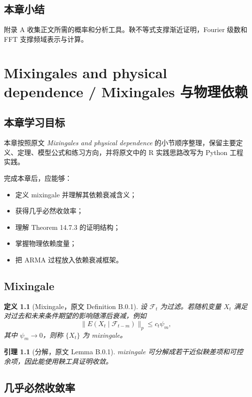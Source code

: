 \documentclass[11pt,a4paper,openany]{ctexbook}
\newtheorem{definition}{定义}[section]
\newtheorem{lemma}{引理}[section]
\begin{document}
\section*{本章小结}

附录 A 收集正文所需的概率和分析工具。鞅不等式支撑渐近证明，Fourier 级数和 FFT 支撑频域表示与计算。

\clearpage
\chapter{Mixingales and physical dependence / Mixingales 与物理依赖}
\section*{本章学习目标}

本章按照原文 \textit{Mixingales and physical dependence} 的小节顺序整理，保留主要定义、定理、模型公式和练习方向，并将原文中的 R 实践思路改写为 Python 工程实践。

完成本章后，应能够：
\begin{itemize}
  \item 定义 mixingale 并理解其依赖衰减含义；
  \item 获得几乎必然收敛率；
  \item 理解 Theorem 14.7.3 的证明结构；
  \item 掌握物理依赖度量；
  \item 把 ARMA 过程放入依赖衰减框架。
\end{itemize}

\section{Mixingale}

\begin{definition}[Mixingale，原文 Definition B.0.1]
设 \(\mathcal F_t\) 为过滤。若随机变量 \(X_t\) 满足对过去和未来条件期望的影响随滞后衰减，例如
\[
  \|E(X_t\mid\mathcal F_{t-m})\|_p\le c_t\psi_m,
\]
其中 \(\psi_m\to0\)，则称 \(\{X_t\}\) 为 mixingale。
\end{definition}

\begin{lemma}[分解，原文 Lemma B.0.1]
mixingale 可分解成若干近似鞅差项和可控余项，因此能使用鞅工具证明收敛。
\end{lemma}

\section{几乎必然收敛率}
\end{document}

